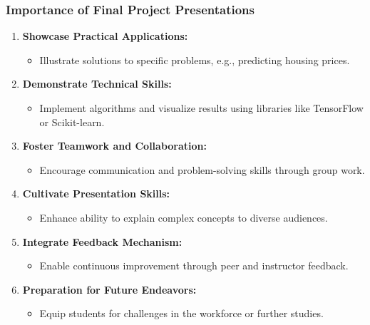 \documentclass[aspectratio=169]{beamer}
\begin{document}
\begin{frame}[fragile]
    \frametitle{Importance of Final Project Presentations}
    \begin{enumerate}
        \item \textbf{Showcase Practical Applications:}
            \begin{itemize}
                \item Illustrate solutions to specific problems, e.g., predicting housing prices.
            \end{itemize}
        
        \item \textbf{Demonstrate Technical Skills:}
            \begin{itemize}
                \item Implement algorithms and visualize results using libraries like TensorFlow or Scikit-learn.
            \end{itemize}

        \item \textbf{Foster Teamwork and Collaboration:}
            \begin{itemize}
                \item Encourage communication and problem-solving skills through group work.
            \end{itemize}

        \item \textbf{Cultivate Presentation Skills:}
            \begin{itemize}
                \item Enhance ability to explain complex concepts to diverse audiences.
            \end{itemize}

        \item \textbf{Integrate Feedback Mechanism:}
            \begin{itemize}
                \item Enable continuous improvement through peer and instructor feedback.
            \end{itemize}

        \item \textbf{Preparation for Future Endeavors:}
            \begin{itemize}
                \item Equip students for challenges in the workforce or further studies.
            \end{itemize}
    \end{enumerate}
\end{frame}
\end{document}
